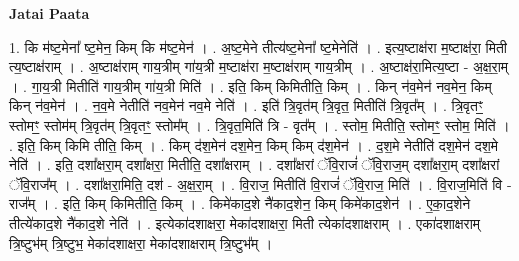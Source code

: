 \documentclass[17pt]{extarticle}
\begin{document}
\textbf{Jatai Paata} \newline

1. कि म॑ष्ट॒मेना᳚ ष्ट॒मेन॒ किम् कि म॑ष्ट॒मेन॑ । . अ॒ष्ट॒मेने तीत्य॑ष्ट॒मेना᳚ ष्ट॒मेनेति॑ । . इत्य॒ष्टाक्ष॑रा म॒ष्टाक्ष॑रा॒ मिती त्य॒ष्टाक्ष॑राम् । . अ॒ष्टाक्ष॑राम् गाय॒त्रीम् गा॑य॒त्री म॒ष्टाक्ष॑रा म॒ष्टाक्ष॑राम् गाय॒त्रीम् । . अ॒ष्टाक्ष॑रा॒मित्य॒ष्टा - अ॒क्ष॒रा॒म् । . गा॒य॒त्री मितीति॑ गाय॒त्रीम् गा॑य॒त्री मिति॑ । . इति॒ किम् किमितीति॒ किम् । . किन् न॑व॒मेन॑ नव॒मेन॒ किम् किन् न॑व॒मेन॑ । . न॒व॒मे नेतीति॑ नव॒मेन॑ नव॒मे नेति॑ । . इति॑ त्रि॒वृत॑म् त्रि॒वृत॒ मितीति॑ त्रि॒वृत᳚म् । . त्रि॒वृतꣳ॒॒ स्तोमꣳ॒॒ स्तोम॑म् त्रि॒वृत॑म् त्रि॒वृतꣳ॒॒ स्तोम᳚म् । . त्रि॒वृत॒मिति॑ त्रि - वृत᳚म् । . स्तोम॒ मितीति॒ स्तोमꣳ॒॒ स्तोम॒ मिति॑ । . इति॒ किम् किमि तीति॒ किम् । . किम् द॑श॒मेन॑ दश॒मेन॒ किम् किम् द॑श॒मेन॑ । . द॒श॒मे नेतीति॑ दश॒मेन॑ दश॒मे नेति॑ । . इति॒ दशा᳚क्षरा॒म् दशा᳚क्षरा॒ मितीति॒ दशा᳚क्षराम् । . दशा᳚क्षरां ॅवि॒राजं॑ ॅवि॒राज॒म् दशा᳚क्षरा॒म् दशा᳚क्षरां ॅवि॒राज᳚म् । . दशा᳚क्षरा॒मिति॒ दश॑ - अ॒क्ष॒रा॒म् । . वि॒राज॒ मितीति॑ वि॒राजं॑ ॅवि॒राज॒ मिति॑ । . वि॒राज॒मिति॑ वि - राज᳚म् । . इति॒ किम् किमितीति॒ किम् । . किमे॑काद॒शे नै॑काद॒शेन॒ किम् किमे॑काद॒शेन॑ । . ए॒का॒द॒शेने तीत्ये॑काद॒शे नै॑काद॒शे नेति॑ । . इत्येका॑दशाक्षरा॒ मेका॑दशाक्षरा॒ मिती त्येका॑दशाक्षराम् । . एका॑दशाक्षराम् त्रि॒ष्टुभ॑म् त्रि॒ष्टुभ॒ मेका॑दशाक्षरा॒ मेका॑दशाक्षराम् त्रि॒ष्टुभ᳚म् । \newline
\end{document}
